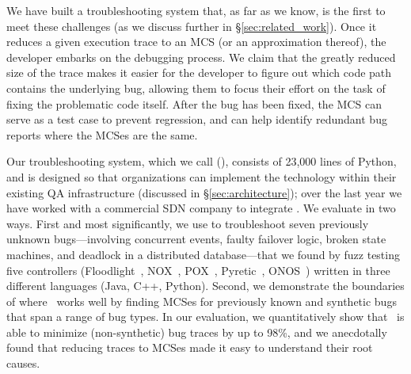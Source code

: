 We have built a troubleshooting system that,
as far as we know, is the first to meet these challenges
(as we discuss further in \S\ref{sec:related_work}). %
Once it reduces a given execution trace to an MCS (or an approximation thereof), the developer embarks
on the debugging process. We claim that the greatly reduced size of the
trace makes it easier for the developer to figure out which code path contains
the underlying bug, allowing them to focus their effort on
the task of fixing the problematic code itself. After the bug has been fixed, the MCS
can serve as a test case to prevent regression,
and can help identify redundant bug reports where the MCSes are the same.

Our troubleshooting system, which we call {\projectname} ({\projectmeaning}),
consists of 23,000 lines of Python, and is designed so that organizations can
implement the technology within their existing QA infrastructure (discussed in
\S\ref{sec:architecture}); over the last year we have worked with a
commercial SDN company to integrate \projectname. We evaluate {\projectname} in
two ways. First and most significantly, we use {\projectname} to troubleshoot
seven previously unknown bugs---involving concurrent events,
faulty failover logic, broken state machines,
and deadlock in a distributed database---that we found
by fuzz testing five controllers (Floodlight~\cite{floodlight}, NOX~\cite{nox},
POX~\cite{pox}, Pyretic~\cite{frenetic}, ONOS~\cite{ONOS})
written in three different languages (Java, C++, Python).
Second, we demonstrate the
boundaries of where \projectname~works well by
finding MCSes for previously known and synthetic bugs that span a range of bug
types. In our evaluation, we quantitatively show that \projectname~is able to
minimize (non-synthetic) bug traces by up to 98\%, and we anecdotally found that reducing
traces to MCSes made it easy to understand their root causes.
